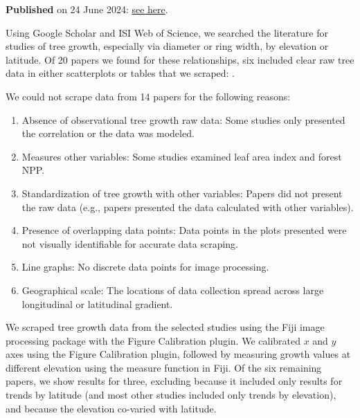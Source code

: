 \documentclass[11pt]{article}
\begin{document}
{\bf Published} on 24 June 2024: \href{https://knb.ecoinformatics.org/submit/urn%3Auuid%3A3b7555df-a2fa-4a44-b150-b7786d4377bc}{see here}.

Using Google Scholar and ISI Web of Science, we searched the literature for studies of tree growth, especially via diameter or ring width, by elevation or latitude. Of 20 papers \citep{babst2013site,bhuta2009climate,cavin2017highest,cook1991predicting,cook1998modeling,coomes2007effects,de2022temperature,gantois2022new,gillman2015latitude,hikosaka2021intraspecific,huang2010radial,king2013tree,klesse2020continental,liang2019forest,martin2015convergence,oleksyn1998growth,rapp2012intra,wang2017climatic,zhou2022altitudinal,zhu2018spatial} we found for these relationships, six included clear raw tree data in either scatterplots or tables that we scraped: \citet{oleksyn1998growth,huang2010radial,cavin2017highest,wang2017climatic,zhu2018spatial,zhou2022altitudinal}. 

We could not scrape data from 14 papers for the following reasons: 
\begin{enumerate}
\item Absence of observational tree growth raw data: Some studies only presented the correlation or the data was modeled. 
\item  Measures other variables: Some studies examined leaf area index and forest NPP. 
\item  Standardization of tree growth with other variables: Papers did not present the raw data (e.g., papers presented the data calculated with other variables).
\item  Presence of overlapping data points: Data points in the plots presented were not visually identifiable for accurate data scraping.
\item Line graphs: No discrete data points for image processing. 
\item Geographical scale: The locations of data collection spread across large longitudinal or latitudinal gradient. 
\end{enumerate}

We scraped tree growth data from the selected studies using the Fiji image processing package with the Figure Calibration plugin. We calibrated $x$ and $y$ axes using the Figure Calibration plugin, followed by measuring growth values at different elevation using the measure function in Fiji. Of the six remaining papers, we show results for three, excluding \citet{huang2010radial} because it included only results for trends by latitude (and most other studies included only trends by elevation), and \citet{cavin2017highest,zhu2018spatial} because the elevation co-varied with latitude. %
\end{document}
